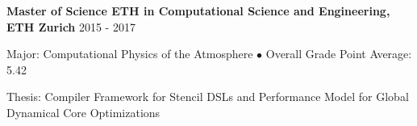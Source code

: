 
\textbf{Master of Science ETH in Computational Science and Engineering, ETH Zurich} \hfill 2015 - 2017

Major: Computational Physics of the Atmosphere $\bullet$ Overall Grade Point Average: 5.42

Thesis: Compiler Framework for Stencil DSLs and Performance Model for Global Dynamical Core Optimizations

